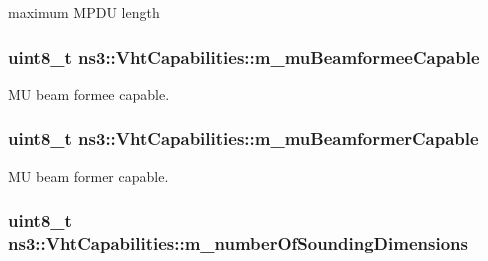 maximum M\+P\+DU length 

\subsubsection[{\texorpdfstring{m\+\_\+mu\+Beamformee\+Capable}{m_muBeamformeeCapable}}]{\setlength{\rightskip}{0pt plus 5cm}uint8\+\_\+t ns3\+::\+Vht\+Capabilities\+::m\+\_\+mu\+Beamformee\+Capable\hspace{0.3cm}{\ttfamily [private]}}\hypertarget{classns3_1_1VhtCapabilities_a4ad315b53baa57cf62dccd0505107f36}{}\label{classns3_1_1VhtCapabilities_a4ad315b53baa57cf62dccd0505107f36}


MU beam formee capable. 

\subsubsection[{\texorpdfstring{m\+\_\+mu\+Beamformer\+Capable}{m_muBeamformerCapable}}]{\setlength{\rightskip}{0pt plus 5cm}uint8\+\_\+t ns3\+::\+Vht\+Capabilities\+::m\+\_\+mu\+Beamformer\+Capable\hspace{0.3cm}{\ttfamily [private]}}\hypertarget{classns3_1_1VhtCapabilities_a436c61de355e9140334b068c001cabde}{}\label{classns3_1_1VhtCapabilities_a436c61de355e9140334b068c001cabde}


MU beam former capable. 

\subsubsection[{\texorpdfstring{m\+\_\+number\+Of\+Sounding\+Dimensions}{m_numberOfSoundingDimensions}}]{\setlength{\rightskip}{0pt plus 5cm}uint8\+\_\+t ns3\+::\+Vht\+Capabilities\+::m\+\_\+number\+Of\+Sounding\+Dimensions\hspace{0.3cm}{\ttfamily [private]}}\hypertarget{classns3_1_1VhtCapabilities_adc25185f388e5c4ee9ea95e226d2d19d}{}\label{classns3_1_1VhtCapabilities_adc25185f388e5c4ee9ea95e226d2d19d}



